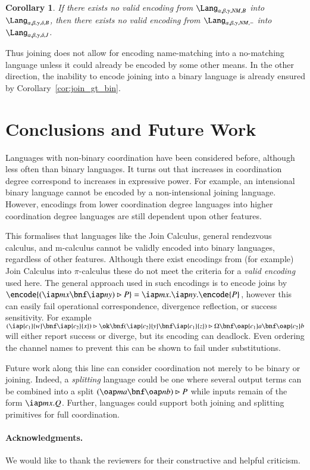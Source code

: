 \documentclass[submission,copyright,creativecommons]{eptcs}
\newtheorem{corollary}[theorem]{Corollary}
\newcommand{\join}[1]{(#1)\rhd }
\begin{document}
\begin{corollary}
If there exists no valid encoding from
$\Lang_{\alpha,\beta,\gamma,\mathit{NM},B}$ into $\Lang_{\alpha,\beta,\gamma,\delta,B}$, then there exists
no valid encoding from $\Lang_{\alpha,\beta,\gamma,\mathit{NM},-}$ into $\Lang_{\alpha,\beta,\gamma,\delta,J}$.
\end{corollary}



Thus joining does not allow for encoding name-matching into a no-matching language unless it could already be
encoded by some other means.
In the other direction, the inability to encode joining into a binary language is already 
ensured by Corollary~\ref{cor:join_gt_bin}.

\section{Conclusions and Future Work}
\label{sec:conclude}

Languages with non-binary coordination have been considered before, although
less often than binary languages.
It turns out that increases in coordination degree correspond to increases in expressive power.
For example, an intensional binary language
cannot be encoded by a non-intensional joining language.
However, encodings from lower coordination degree languages into higher coordination degree
languages are still dependent upon other features.

This formalises that languages like the Join Calculus, general rendezvous calculus, and m-calculus
cannot be validly encoded into binary languages, regardless of other features.
Although there exist encodings from (for example) Join Calculus into $\pi$-calculus
\cite{Fournet_thereflexive}
these do not meet the criteria for a {\em valid encoding} used here.
The general approach used in such encodings is to encode joins by
$\encode{\join {\iap m x \bnf \iap n y} P}=\iap m x .\iap n y.\encode{P}$,
however this can easily fail operational correspondence, divergence reflection, or success sensitivity.
For example
${\join{\iap {c_1} {w}\bnf \iap {c_2} {x}}\ok \bnf \join {\iap {c_2} {y} \bnf \iap {c_1} {z}}\Omega
\bnf \oap {c_1} a\bnf \oap {c_2} b}$ will either report success or diverge, but its encoding can deadlock.
Even ordering the channel names to prevent this can be shown to fail under substitutions.

Future work along this line can consider coordination not merely to be binary or joining.
Indeed, a {\em splitting} language could be one where several output terms can be combined into
a split $\join {\oap m a\bnf \oap n b} P$ while inputs remain of the form $\iap m x .Q$.
Further, languages could support both joining and splitting primitives for full coordination.

\paragraph{Acknowledgments.} We would like to thank the reviewers for their constructive and helpful criticism.



\end{document}
